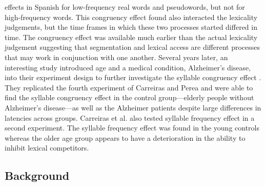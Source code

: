 effects in Spanish for low-frequency real words and pseudowords, but not for high-frequency words. This congruency effect found also interacted the lexicality judgements, but the time frames in which these two processes started differed in time. The congruency effect was available much earlier than the actual lexicality judgement suggesting that segmentation and lexical access are different processes that may work in conjunction with one another. Several years later, an interesting study introduced age and a medical condition, Alzheimer’s disease, into their experiment design to further investigate the syllable congruency effect \citep{Carreiras2008-ar}. They replicated the fourth experiment of Carreiras and Perea \parencite*{Carreiras2002-mp} and were able to find the syllable congruency effect in the control group—elderly people without Alzheimer’s disease—as well as the Alzheimer patients despite large differences in latencies across groups. Carreiras et al. \parencite*{Carreiras2008-ar} also tested syllable frequency effect in a second experiment. The syllable frequency effect was found in the young controls whereas the older age group appears to have a deterioration in the ability to inhibit lexical competitors.


\subsection{Background}



